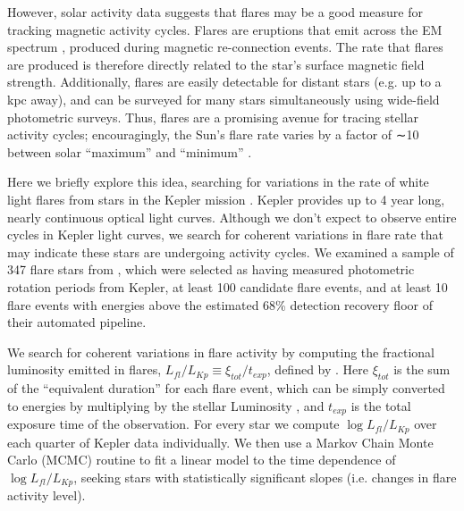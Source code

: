 \documentclass[RNAAS, modern]{aastex62}
\begin{document}
However, solar activity data suggests that flares may be a good measure for tracking magnetic activity cycles. 
Flares are eruptions that emit across the EM spectrum \citep[e.g. see][]{hawley2003}, produced during magnetic re-connection events. The rate that flares are produced is therefore directly related to the star's surface magnetic field strength. Additionally, flares are easily detectable for distant stars (e.g. up to a kpc away), and can be surveyed for many stars simultaneously using wide-field photometric surveys. Thus, flares are a promising avenue for tracing stellar activity cycles; encouragingly, the Sun's flare rate varies by a factor of ∼10 between solar “maximum” and “minimum” \citep[e.g.][]{veronig2002, aschwanden2012}. 



Here we briefly explore this idea, searching for variations in the rate of white light flares from stars in the Kepler mission \citep{borucki2010}. Kepler provides up to 4 year long, nearly continuous optical light curves. Although we don't expect to observe entire cycles in Kepler light curves, we search for coherent variations in flare rate that may indicate these stars are undergoing activity cycles. We examined a sample of 347 flare stars from \citet{davenport2019}, which were selected as having measured photometric rotation periods from Kepler, at least 100 candidate flare events, and at least 10 flare events with energies above the estimated 68\% detection recovery floor of their automated pipeline.

 
We search for coherent variations in flare activity by computing the fractional luminosity emitted in flares, $L_{fl}/L_{Kp} \equiv \xi_{tot}/t_{exp}$, defined by \citet{lurie2015}. Here $\xi_{tot}$ is the sum of the ``equivalent duration'' for each flare event, which can be simply converted to energies by multiplying by the stellar Luminosity \citep{huntwalker2012}, and $t_{exp}$ is the total exposure time of the observation. For every star we compute $\log L_{fl}/L_{Kp}$ over each quarter of Kepler data individually. We then use a Markov Chain Monte Carlo (MCMC) routine to fit a linear model to the time dependence of $\log L_{fl}/L_{Kp}$, seeking stars with statistically significant slopes (i.e. changes in flare activity level).
 
 
\end{document}
